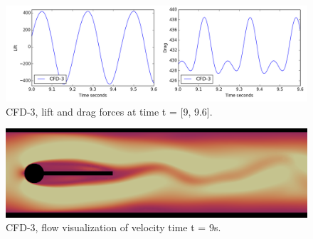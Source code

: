 \begin{figure}[h!]
  \centering
    \includegraphics[scale=0.5]{./Fig/cfd3_liftdrag.png}
      \caption{CFD-3, lift and drag forces at time t = [9, 9.6].}
\end{figure}

\begin{figure}[h!]
  \centering
    \includegraphics[scale=0.2]{./Fig/cfd3.png}
      \caption{CFD-3, flow visualization of velocity time t = 9s.}
\end{figure}

\newpage

